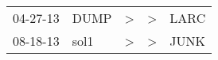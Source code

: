 \begin{supertabular}{lllll}
 04-27-13 &  DUMP &  \textgreater &  \textgreater &  LARC \\
 08-18-13 &  sol1 &  \textgreater &  \textgreater &  JUNK \\
\end{supertabular}
